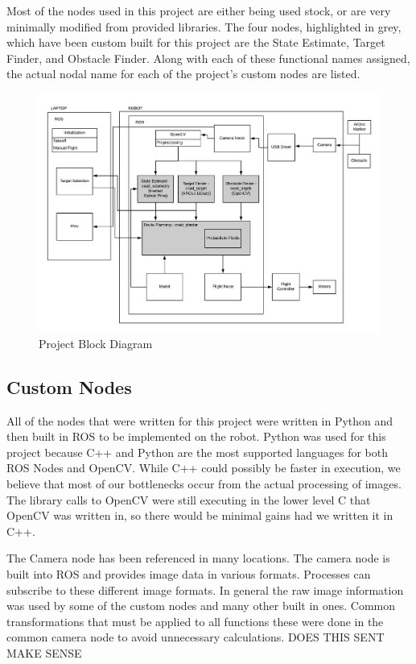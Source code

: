 \documentclass{article}
\begin{document}
	Most of the nodes used in this project are either being used stock, or are very minimally modified from provided libraries. The four nodes, highlighted in grey, which have been custom built for this project are the State Estimate, Target Finder, and Obstacle Finder. Along with each of these functional names assigned, the actual nodal name for each of the project's custom nodes are listed.

	\begin{figure}[H]
		\centering
		\includegraphics[width=\linewidth]{BlockDiagram}
		\caption{Project Block Diagram}
		\label{fig:blockdiagram}
	\end{figure}

	\subsection{Custom Nodes}
	
	 All of the nodes that were written for this project were written in Python and then built in ROS to be implemented on the robot. Python was used for this project because C++ and Python are the most supported languages for both ROS Nodes and OpenCV. While C++ could possibly be faster in execution, we believe that most of our bottlenecks occur from the actual processing of images. The library calls to OpenCV were still executing in the lower level C that OpenCV was written in, so there would be minimal gains had we written it in C++.
	 
	 The Camera node has been referenced in many locations. The camera node is built into ROS and provides image data in various formats. Processes can subscribe to these different image formats. In general the raw image information was used by some of the custom nodes and many other built in ones. Common transformations that must be applied to all functions these were done in the common camera node to avoid unnecessary calculations. DOES THIS SENT MAKE SENSE
	
\end{document}
